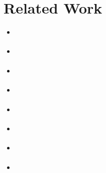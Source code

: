 \section{Related Work}

\begin{itemize}
\item \citep{tidallock}
\item \citep{bonnaire-sergeant2012typed-clojure}
\item \citep{vitousek2014deg}
\item \citep{allende2013gts}
\item \citep{tobin-hochstadt2008ts} 
\item \citep{dart}
\item \citep{typescript}
\item \citep{politz2012semantics}
\end{itemize}
